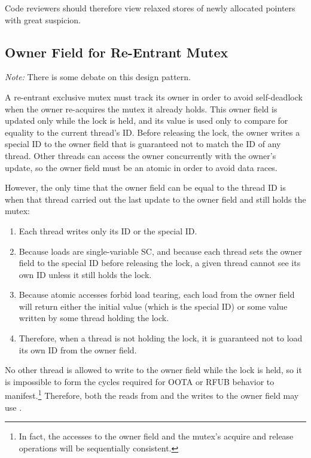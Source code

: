 \documentclass[10]{article}
\begin{document}
Code reviewers should therefore view relaxed stores of newly allocated
pointers with great suspicion.

\subsection{Owner Field for Re-Entrant Mutex}
\label{sec:Owner Field for Re-Entrant Mutex}

\emph{Note:} There is some debate on this design pattern.

A re-entrant exclusive mutex must track its owner in order to avoid
self-deadlock when the owner re-acquires the mutex it already holds.
This owner field is updated only while the lock is held, and its value
is used only to compare for equality to the current thread's ID.
Before releasing the lock, the owner writes a special ID to the owner
field that is guaranteed not to match the ID of any thread.
Other threads can access the owner concurrently with the owner's
update, so the owner field must be an atomic in order to avoid data races.

However, the only time that the owner field can be equal to the thread ID
is when that thread carried out the last update to the owner field and
still holds the mutex:

\begin{enumerate}
\item	Each thread writes only its ID or the special ID.
\item	Because  loads are single-variable
	SC, and because each thread sets the owner field to the special
	ID before releasing the lock, a given thread cannot see its own
	ID unless it still holds the lock.
\item	Because atomic accesses forbid load tearing, each load from
	the owner field will return either the initial value
	(which is the special ID) or some value written by some
	thread holding the lock.
\item	Therefore, when a thread is not holding the lock, it is guaranteed
	not to load its own ID from the owner field.
\end{enumerate}

No other thread is allowed to write to the owner field while the lock
is held, so it is impossible to form the cycles required for OOTA or
RFUB behavior to manifest.\footnote{
	In fact, the accesses to the owner field and the mutex's acquire
	and release operations will be sequentially consistent.}
Therefore, both the reads from and the writes to the owner field
may use .
\end{document}
